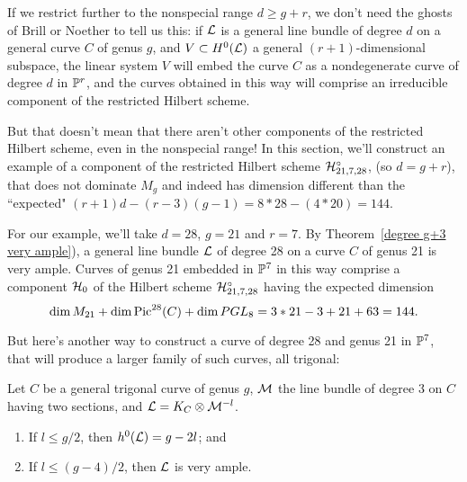 If we restrict further to the nonspecial range $d \geq g + r$, we don't need the ghosts of Brill or Noether to tell us this: if $\cL$ is a general line bundle of degree $d$ on a general curve $C$ of genus $g$, and $V \subset H^0(\cL)$ a general $(r+1)$-dimensional subspace, the linear system $V$ will embed the curve $C$ as a nondegenerate curve of degree $d$ in $\PP^{r}$, and the curves obtained in this way will comprise an irreducible component of the restricted Hilbert scheme.

But that doesn't mean that there aren't other components of the restricted Hilbert scheme, even in the nonspecial range! In this section, we'll construct an example of a component of the restricted Hilbert scheme $\cH^\circ_{21,7,28}$,  (so $d = g+r$), that does not dominate $M_g$ and indeed has dimension different than the ``expected" $(r+1)d - (r-3)(g-1) = 8*28-(4*20) = 144$.

For our example, we'll take $d = 28$, $g = 21$ and $r=7$. By Theorem~\ref{degree g+3 very ample}), a general line bundle $\cL$ of degree 28 on a curve $C$ of genus 21 is  very ample. Curves of genus 21 embedded in $\PP^7$ in this way comprise a component $\cH_0$ of the Hilbert scheme $\cH^\circ_{21, 7, 28}$ having the expected dimension 
$$
\dim M_{21} + \dim \Pic^{28}(C) + \dim PGL_8=3*21-3+21 + 63 =  144.
$$

But here's another way to construct a curve of degree 28 and genus 21 in $\PP^7$, that will produce a larger family of such curves, 
all trigonal:

\begin{lemma}
Let $C$ be a general trigonal curve of genus $g$, $\cM$  the line bundle of degree 3 on $C$ having two sections, and $\cL = K_C \otimes \cM^{-l}$.
\begin{enumerate}
\item If $l \leq g/2$, then $h^0(\cL) = g - 2l$; and
\item If $l \leq (g-4)/2$, then $\cL$ is very ample.
\end{enumerate}
\end{lemma}

